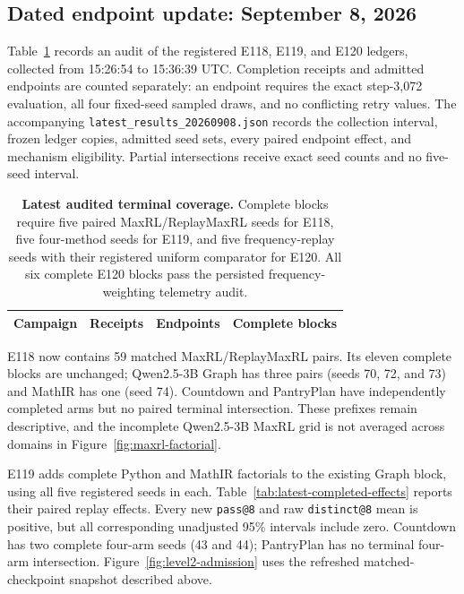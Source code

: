 \subsection{Dated endpoint update: September 8, 2026}
\label{app:latest-results-update}

Table~\ref{tab:latest-results-update} records an audit of the registered
E118, E119, and E120 ledgers, collected from 15:26:54 to 15:36:39 UTC.
Completion receipts and admitted endpoints are counted separately: an endpoint
requires the exact step-3,072 evaluation, all four fixed-seed sampled draws,
and no conflicting retry values. The accompanying
\texttt{latest\_results\_20260908.json} records the collection interval,
frozen ledger copies, admitted seed sets, every paired endpoint effect, and
mechanism eligibility. Partial intersections receive exact seed counts and
no five-seed interval.

\begin{table}[H]
  \centering
  \caption{\textbf{Latest audited terminal coverage.}
  Complete blocks require five paired MaxRL/ReplayMaxRL seeds for E118,
  five four-method seeds for E119, and five frequency-replay seeds with
  their registered uniform comparator for E120. All six complete E120 blocks
  pass the persisted frequency-weighting telemetry audit.}
  \label{tab:latest-results-update}
  \small
  \setlength{\tabcolsep}{5pt}
  \begin{tabular}{@{}lrrr@{}}
    \toprule
    \textbf{Campaign} & \textbf{Receipts} & \textbf{Endpoints}
      & \textbf{Complete blocks} \\
    \midrule
    
  \end{tabular}
\end{table}

E118 now contains 59 matched MaxRL/ReplayMaxRL pairs. Its eleven complete
blocks are unchanged; Qwen2.5-3B Graph has three pairs (seeds 70, 72, and 73)
and MathIR has one (seed 74). Countdown and PantryPlan have independently
completed arms but no paired terminal intersection. These prefixes remain
descriptive, and the incomplete Qwen2.5-3B MaxRL grid is not averaged across
domains in Figure~\ref{fig:maxrl-factorial}.

E119 adds complete Python and MathIR factorials to the existing Graph block,
using all five registered seeds in each. Table~\ref{tab:latest-completed-effects}
reports their paired replay effects. Every new \texttt{pass@8} and raw
\texttt{distinct@8} mean is positive, but all corresponding unadjusted 95\%
intervals include zero. Countdown has two complete four-arm seeds (43 and 44);
PantryPlan has no terminal four-arm intersection. Figure~\ref{fig:level2-admission}
uses the refreshed matched-checkpoint snapshot described above.

